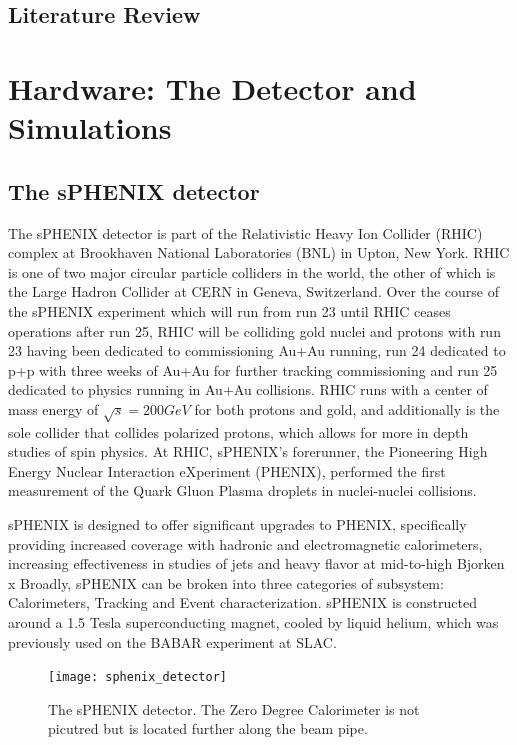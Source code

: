 \documentclass[letterpaper, 12pt, oneside]{book}
\theoremstyle{definition}
\begin{document}
\frontmatter

\setcounter{page}{2}





\tableofcontents
\listoftables
\listoffigures

\mainmatter
\chapter{Literature Review}
\label{ch:LR}
 
\part{Hardware: The Detector and Simulations}
\chapter{The sPHENIX detector}
The sPHENIX detector is part of the Relativistic Heavy Ion Collider (RHIC) complex at Brookhaven National Laboratories (BNL) in Upton, New York. 
RHIC is one of two major circular particle colliders in the world, the other of which is the Large Hadron Collider at CERN in Geneva, Switzerland. 
Over the course of the sPHENIX experiment which will run from run 23 until RHIC ceases operations after run 25, RHIC will be colliding gold nuclei and protons with run 23 having been dedicated to commissioning Au+Au running, 
run 24 dedicated to p+p with three weeks of Au+Au for further tracking commissioning and run 25 dedicated to physics running in Au+Au collisions. 
RHIC runs with a center of mass energy of $\sqrt{s} = 200 GeV$ for both protons and gold, and additionally is the sole collider that collides polarized protons, which allows for more in depth studies of spin physics. 
At RHIC, sPHENIX's forerunner, the Pioneering High Energy Nuclear Interaction eXperiment (PHENIX), performed the first measurement of the Quark Gluon Plasma droplets \cite{QGP_droplets} in nuclei-nuclei collisions. 

sPHENIX is designed to offer significant upgrades to PHENIX, specifically providing increased coverage with hadronic and electromagnetic calorimeters, increasing effectiveness in studies of jets and heavy flavor at mid-to-high Bjorken x \cite{sPHENIX_TDR}\cite{sPHENIX_whitepaper}\cite{sPHENIX_physics_goals}
Broadly, sPHENIX can be broken into three categories of subsystem: Calorimeters, Tracking and Event characterization.
sPHENIX is constructed around a 1.5 Tesla superconducting magnet, cooled by liquid helium, which was previously used on the BABAR experiment at SLAC. 
\begin{figure}
	\texttt{[image: sphenix\_detector]}
	\caption{The sPHENIX detector. The Zero Degree Calorimeter is not picutred but is located further along the beam pipe.}
	\label{fig:sphenix_detector}
\end{figure}
\end{document}
